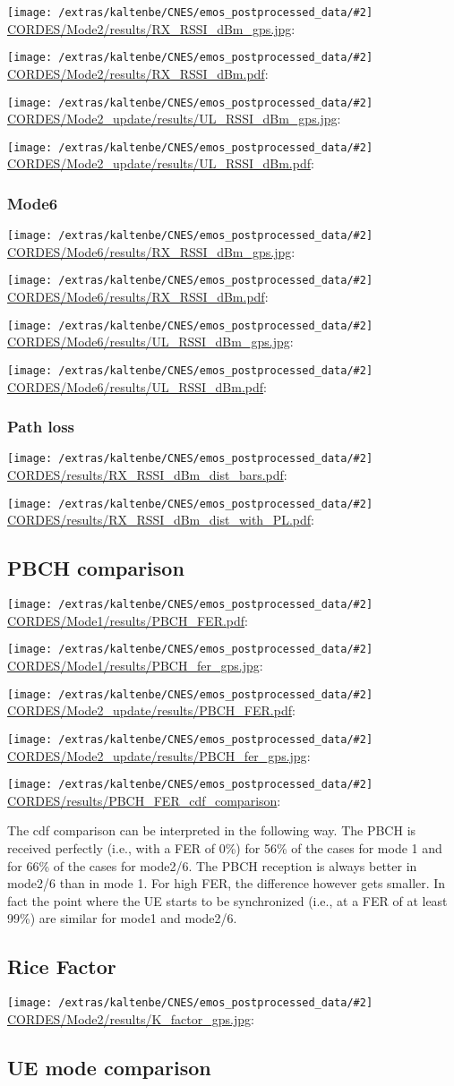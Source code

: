 \documentclass[a4paper,10pt]{article}
\newcommand{\printfile}[2][]{
 \begin{minipage}{8cm}
  \centering
  \texttt{[image: /extras/kaltenbe/CNES/emos\_postprocessed\_data/\#2]}
  \url{#2}: #1

 \end{minipage}
}
\begin{document}
\printfile{CORDES/Mode2/results/RX_RSSI_dBm_gps.jpg}
\printfile{CORDES/Mode2/results/RX_RSSI_dBm.pdf}

\printfile{CORDES/Mode2_update/results/UL_RSSI_dBm_gps.jpg}
\printfile{CORDES/Mode2_update/results/UL_RSSI_dBm.pdf}

\subsubsection{Mode6}
\printfile{CORDES/Mode6/results/RX_RSSI_dBm_gps.jpg}
\printfile{CORDES/Mode6/results/RX_RSSI_dBm.pdf}

\printfile{CORDES/Mode6/results/UL_RSSI_dBm_gps.jpg}
\printfile{CORDES/Mode6/results/UL_RSSI_dBm.pdf}

\subsubsection{Path loss}
\printfile{CORDES/results/RX_RSSI_dBm_dist_bars.pdf}
\printfile{CORDES/results/RX_RSSI_dBm_dist_with_PL.pdf}


\subsection{PBCH comparison}

\printfile{CORDES/Mode1/results/PBCH_FER.pdf}
\printfile{CORDES/Mode1/results/PBCH_fer_gps.jpg}

\printfile{CORDES/Mode2_update/results/PBCH_FER.pdf}
\printfile{CORDES/Mode2_update/results/PBCH_fer_gps.jpg}

\printfile{CORDES/results/PBCH_FER_cdf_comparison}

The cdf comparison can be interpreted in the following way. The PBCH is received perfectly (i.e., with a FER of 0\%) for 56\% of the cases for mode 1 and for 66\% of the cases for mode2/6. The PBCH reception is always better in mode2/6 than in mode 1. For high FER, the difference however gets smaller. In fact the point where the UE starts to be synchronized (i.e., at a FER of at least 99\%) are similar for mode1 and mode2/6. 

\subsection{Rice Factor}

\printfile{CORDES/Mode2/results/K_factor_gps.jpg}

\subsection{UE mode comparison}
\end{document}
